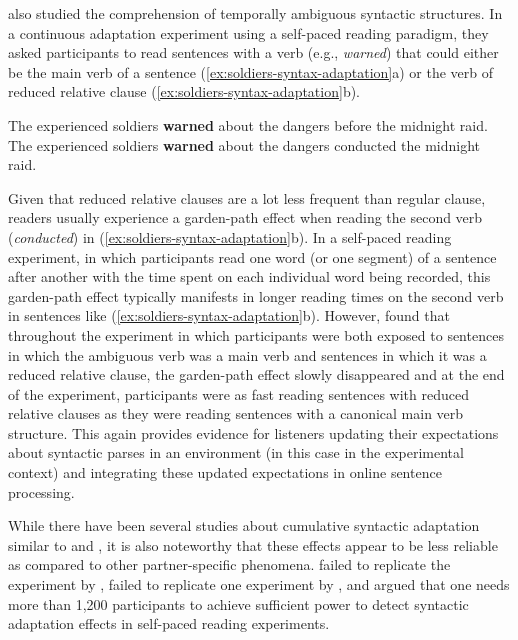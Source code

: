 \textcite{Fine2013} also studied the comprehension of temporally ambiguous syntactic structures. In a continuous adaptation experiment using a self-paced reading paradigm,
they asked participants to read sentences with a verb (e.g., \textit{warned}) that could either be the main verb of a sentence (\ref{ex:soldiers-syntax-adaptation}a) or the verb of reduced relative clause (\ref{ex:soldiers-syntax-adaptation}b).
\begin{exe}
\ex \begin{xlist} \label{ex:soldiers-syntax-adaptation}
\ex The experienced soldiers \textbf{warned} about the dangers before the midnight raid.
\ex The experienced soldiers \textbf{warned} about the dangers conducted the midnight raid.
\end{xlist}
\end{exe}
\noindent Given that reduced relative clauses are a lot less frequent than regular clause, readers usually experience a garden-path effect 
when reading the second verb (\textit{conducted}) in (\ref{ex:soldiers-syntax-adaptation}b). In a self-paced reading experiment, in which 
participants read one word (or one segment) of a sentence after another with the time spent on each individual word being recorded,
this garden-path effect typically manifests in longer reading times on the second verb in sentences like (\ref{ex:soldiers-syntax-adaptation}b).
However, \textcite{Fine2013} found that throughout the experiment in which participants were both exposed to sentences in which the ambiguous verb
was a main verb and sentences in which it was a reduced relative clause, the garden-path effect slowly disappeared and at the end of the experiment,
participants were as fast reading sentences with reduced relative clauses as they were reading sentences with a canonical main verb structure.
This again provides evidence for listeners updating their expectations about syntactic parses in an environment (in this case in the experimental context)
and integrating these updated expectations in online sentence processing.

While there have been several studies about cumulative syntactic adaptation similar to \textcite{Kamide2012} and \textcite{Fine2013}, it is also noteworthy
that these effects appear to be less reliable as compared to other partner-specific phenomena. \textcite{Liu2017} failed to replicate the experiment by \textcite{Kamide2012}, 
\textcite{HarringtonStack2018} failed to replicate one experiment by  \textcite{Fine2013}, and \textcite{Prasad2020} argued that one needs more than 1,200
participants to achieve sufficient power to detect syntactic adaptation effects in self-paced reading experiments.

